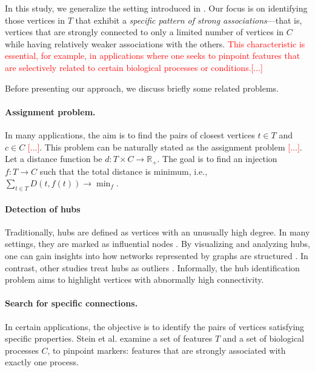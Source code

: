 \documentclass{llncs}
\newcommand{\red}[1]{\textcolor{red}{#1}}
\begin{document}
In this study, we generalize the setting introduced in \cite{stein-obrien_patternmarkers_2017}. Our focus is on identifying those vertices in $T$ that exhibit a \textit{specific pattern of strong associations}---that is, vertices that are strongly connected to only a limited number of vertices in
$C$ while having relatively weaker associations with the others. \textcolor{red}{This characteristic is essential, for example, in applications where one seeks to pinpoint features that are selectively related to certain biological processes or conditions.}\red{[...]}

Before presenting our approach, we discuss briefly some related problems.

\paragraph{Assignment problem.} In many applications, the aim is to find the pairs of closest vertices $t\in T$ and $c \in C$ \red{[...]}. 
This problem can be naturally stated as the assignment problem \red{[...]}. Let a distance function be $d \colon T \times C \rightarrow \mathbb{R}_{+} $. The goal is to find an injection $f: T \rightarrow C$ such that the total distance is minimum, i.e., $\sum_{t\in T}D(t, f(t)) \rightarrow \min_{f}$.

\paragraph{Detection of hubs}
Traditionally, hubs are defined as vertices with an unusually high degree. In many settings, they are marked as influential nodes \cite{shiokawa2015scan}. By visualizing and analyzing hubs, one can gain insights into how networks represented by graphs are structured \cite{royer2022epilepsy}. In contrast, other studies treat hubs as outliers \cite{kirkley2024identifying}. Informally, the hub identification problem aims to highlight vertices with abnormally high connectivity.

\paragraph{Search for specific connections.} In certain applications, the objective is to identify the pairs of vertices satisfying specific properties. Stein et al. \cite{stein-obrien_patternmarkers_2017} examine a set of features $T$ and a set of biological processes $C$, to pinpoint markers: features that are strongly associated with exactly one process. 
\vspace{12pt}
\end{document}

